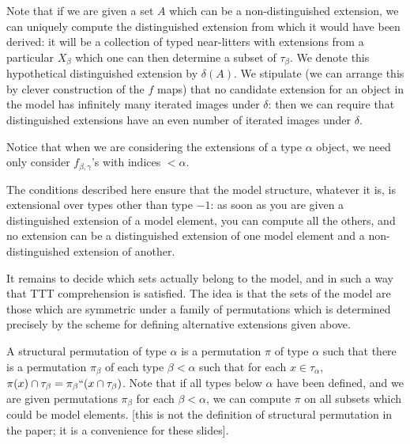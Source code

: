 \documentclass{slides}
\begin{document}
\begin{slide}

Note that if we are given a set $A$ which can be a non-distinguished extension, we can uniquely compute the distinguished extension from which it would have been derived:  it will be a collection of typed near-litters with extensions from a particular $X_\beta$ which one can then determine a subset of $\tau_\beta$.  We denote this hypothetical distinguished extension by $\delta(A)$.  We stipulate (we can arrange this by clever construction of the $f$ maps) that no candidate extension for an object in the model has infinitely many iterated images under $\delta$:  then we can require that distinguished extensions have an even number of iterated images under $\delta$.

Notice that when we are considering the extensions of a type $\alpha$ object, we need only consider $f_{\beta,\gamma}$'s with indices $<\alpha$.

\end{slide}

\begin{slide}

The conditions described here ensure that the model structure, whatever it is, is extensional over types other than type $-1$:  as soon as you are given a distinguished extension of a model element, you can compute all the others, and no extension can be a distinguished extension of one model element and a non-distinguished extension of another.

\end{slide}

\begin{slide}

It remains to decide which sets actually belong to the model, and in such a way that TTT comprehension is satisfied.  The idea is that the sets of the model are those which are symmetric under a family of permutations
which is determined precisely by the scheme for defining alternative extensions given above.

A structural permutation of type $\alpha$ is a permutation $\pi$ of type $\alpha$ such that there is a permutation $\pi_\beta$ of each type $\beta<\alpha$ such that for each $x \in \tau_\alpha$, $\pi(x) \cap \tau_\beta = \pi_{\beta}``(x \cap \tau_\beta)$.  Note that if all types below $\alpha$ have been defined, and we are given permutations $\pi_\beta$ for each $\beta<\alpha$, we can compute $\pi$ on all subsets which could be model elements.  [this is not the definition of structural permutation in the paper;  it is a convenience for these slides].

\end{slide}
\end{document}
